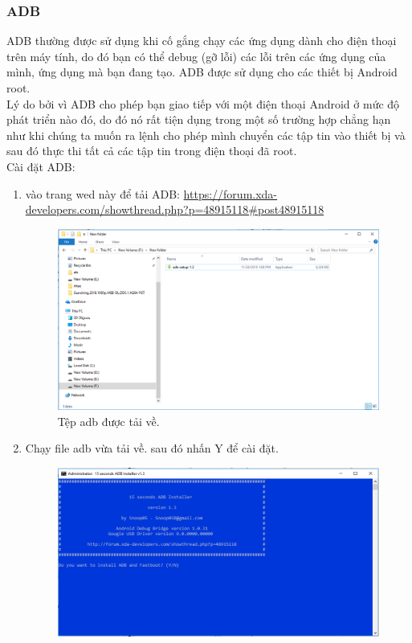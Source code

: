 \subsubsection{ADB}
 \label{ADB}ADB thường được sử dụng khi cố gắng chạy các ứng dụng dành cho điện thoại trên máy tính, do đó bạn có thể debug (gỡ lỗi) các lỗi trên các ứng dụng của mình, ứng dụng mà bạn đang tạo. ADB được sử dụng cho các thiết bị Android root.\\
 Lý do bởi vì ADB cho phép bạn giao tiếp với một điện thoại Android ở mức độ phát triển nào đó, do đó nó rất tiện dụng trong một số trường hợp chẳng hạn như khi chúng ta muốn ra lệnh cho phép mình chuyển các tập tin vào thiết bị và sau đó thực thi tất cả các tập tin trong điện thoại đã root.\\
 Cài đặt ADB:
 \begin{enumerate}
     \item vào trang wed này để tải ADB:  \url{https://forum.xda-developers.com/showthread.php?p=48915118#post48915118}
 \begin{center}
    \begin{figure}[htp]
    \begin{center}
     \includegraphics[scale=0.35]{image3/adb1}
    \end{center}
    \caption{Tệp adb được tải về.}
    \label{refhinh1}
    \end{figure}
\end{center}
    \item Chạy file adb vừa tải về. sau đó nhấn Y để cài đặt.
\newpage
 \begin{center}
    \begin{figure}[htp]
    \begin{center}
     \includegraphics[scale=0.35]{image3/giaodienadb}

\end{center}
\end{figure}
\end{center}
\end{enumerate}

